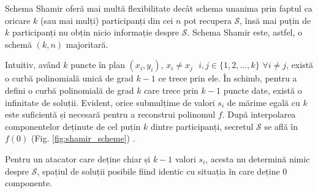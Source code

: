 \documentclass[oneside, 12pt]{book}
\begin{document}
Schema Shamir oferă mai multă flexibilitate decât schema unanima prin faptul ca oricare $k$ (sau mai mulți) participanți
din cei $n$ pot recupera $\mathcal{S}$, însă mai puțin de $k$ participanți nu obțin nicio informație despre $\mathcal{S}$. Schema Shamir este, astfel, o schemă $(k,n)$ majoritară.

Intuitiv, având $k$ puncte în plan $(x_i, y_i)$, $x_i \neq x_j \text{ } i,j \in \{1,2,\dots,k\}$ $\forall i \neq j$, există o curbă polinomială unică de grad $k - 1$ ce trece prin ele.  
În schimb, pentru a defini o curbă polinomială de grad $k$ care trece prin $k - 1$ puncte date, există o infinitate de soluții.
Evident, orice submulțime de valori $s_i$ de mărime egală cu $k$ este suficientă și necesară pentru a reconstrui polinomul $f$. După interpolarea componentelor deținute de cel puțin $k$ dintre participanți, secretul $\mathcal{S}$ se află în $f(0)$ (Fig. \ref{fig:shamir_scheme}) \cite{S:1979}.

Pentru un atacator care deține chiar și $k-1$ valori $s_i$, acesta nu determină nimic despre $\mathcal{S}$, spațiul de soluții posibile fiind identic cu situația în care deține $0$ componente.
\end{document}
